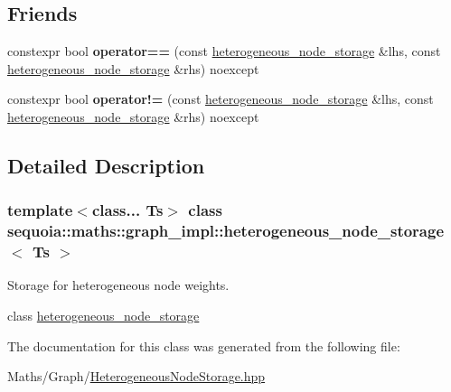 \subsection*{Friends}
\begin{DoxyCompactItemize}
\item 
\mbox{\label{classsequoia_1_1maths_1_1graph__impl_1_1heterogeneous__node__storage_a773b21a3352726cda84dfb30e623ea5d}} 
constexpr bool {\bfseries operator==} (const \mbox{\hyperlink{classsequoia_1_1maths_1_1graph__impl_1_1heterogeneous__node__storage}{heterogeneous\+\_\+node\+\_\+storage}} \&lhs, const \mbox{\hyperlink{classsequoia_1_1maths_1_1graph__impl_1_1heterogeneous__node__storage}{heterogeneous\+\_\+node\+\_\+storage}} \&rhs) noexcept
\item 
\mbox{\label{classsequoia_1_1maths_1_1graph__impl_1_1heterogeneous__node__storage_a7058a12d08eb27d819592f0c38a5e672}} 
constexpr bool {\bfseries operator!=} (const \mbox{\hyperlink{classsequoia_1_1maths_1_1graph__impl_1_1heterogeneous__node__storage}{heterogeneous\+\_\+node\+\_\+storage}} \&lhs, const \mbox{\hyperlink{classsequoia_1_1maths_1_1graph__impl_1_1heterogeneous__node__storage}{heterogeneous\+\_\+node\+\_\+storage}} \&rhs) noexcept
\end{DoxyCompactItemize}


\subsection{Detailed Description}
\subsubsection*{template$<$class... Ts$>$\newline
class sequoia\+::maths\+::graph\+\_\+impl\+::heterogeneous\+\_\+node\+\_\+storage$<$ Ts $>$}

Storage for heterogeneous node weights. 

class \mbox{\hyperlink{classsequoia_1_1maths_1_1graph__impl_1_1heterogeneous__node__storage}{heterogeneous\+\_\+node\+\_\+storage}} 

The documentation for this class was generated from the following file\+:\begin{DoxyCompactItemize}
\item 
Maths/\+Graph/\mbox{\hyperlink{_heterogeneous_node_storage_8hpp}{Heterogeneous\+Node\+Storage.\+hpp}}\end{DoxyCompactItemize}
